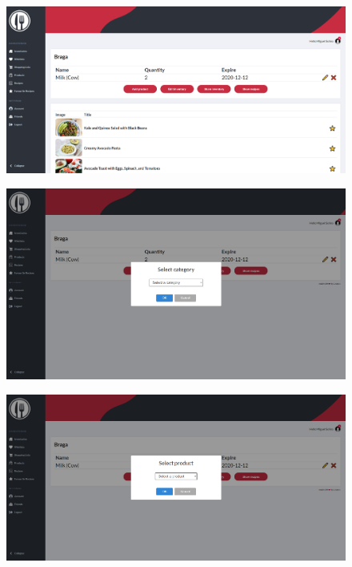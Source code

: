 \documentclass[a4paper]{report}
\begin{document}
    \begin{figure}[H]
        \centering
            \includegraphics[width=\textwidth]{images/produto_final/iventario_receitas.png}
    \end{figure}

    \begin{figure}[H]
        \centering
            \includegraphics[width=\textwidth]{images/produto_final/inserir_produto_categoria.png}
    \end{figure}

    \begin{figure}[H]
        \centering
            \includegraphics[width=\textwidth]{images/produto_final/inserir_produto_produto.png}
    \end{figure}
\end{document}
